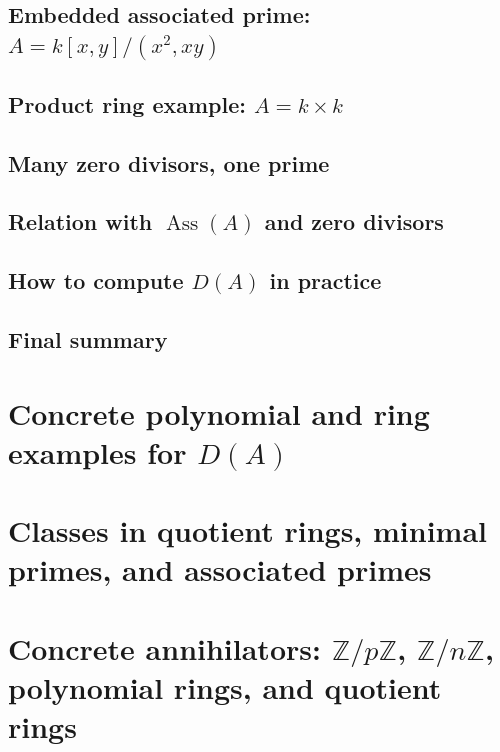 \documentclass[12pt,a4paper,oneside]{report}
\DeclareMathOperator{\Ass}{Ass}
\theoremstyle{notespace}
\begin{document}
\section{Embedded associated prime: \(A=k[x,y]/(x^2,xy)\)}

\section{Product ring example: \(A=k\times k\)}

\section{Many zero divisors, one prime}

\section{Relation with \(\Ass(A)\) and zero divisors}

\section{How to compute \(D(A)\) in practice}

\section{Final summary}

\chapter{Concrete polynomial and ring examples for \(D(A)\)}

\chapter{Classes in quotient rings, minimal primes, and associated primes}

\chapter{Concrete annihilators: \(\mathbb Z/p\mathbb Z\), \(\mathbb Z/n\mathbb Z\), polynomial rings, and quotient rings}
\end{document}
